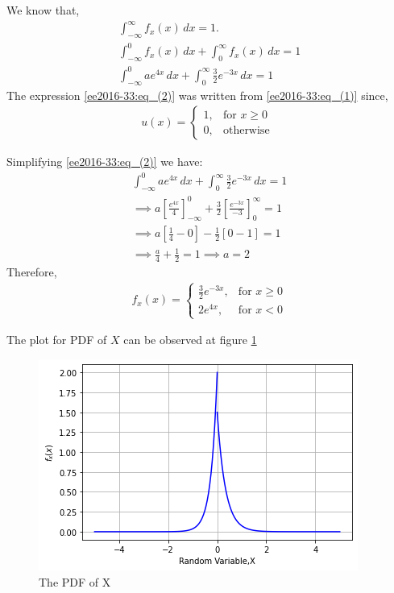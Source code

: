 We know that,
\begin{align}
\int_{-\infty}^{\infty}{f_x(x)}\,dx = 1.\\
\int_{-\infty}^{0}{f_x(x)}\,dx +\int_{0}^{\infty}{f_x(x)}\,dx = 1\label{ee2016-33:eq_(1)}\\
\int_{-\infty}^{0}{ae^{4x}}\,dx +\int_{0}^{\infty}{\frac{3}{2}e^{-3x}}\,dx = 1\label{ee2016-33:eq_(2)}
\end{align}
The expression \eqref{ee2016-33:eq_(2)} was written from \eqref{ee2016-33:eq_(1)} since,
\begin{align*}
  u(x) = 
  \begin{cases}
  1, & \text{for } x \geq 0\\
  0, & \text{otherwise } 
  \end{cases}
\end{align*}

Simplifying \eqref{ee2016-33:eq_(2)} we have:
\begin{align}
\int_{-\infty}^{0}{ae^{4x}}\,dx +\int_{0}^{\infty}{\frac{3}{2}e^{-3x}}\,dx = 1\nonumber\\
\implies a\left[\frac{e^{4x}}{4}\right]_{-\infty}^{0} +    \frac{3}{2}\left[\frac{e^{-3x}}{-3}\right]_0^{\infty} = 1\\
\implies a\left[\frac{1}{4}-0\right] - \frac{1}{2}\left[0-1\right] = 1\\
\implies \frac{a}{4} + \frac{1}{2} =1 \implies a = 2
\end{align}
Therefore,
\begin{align}
 f_x(x) = 
  \begin{cases}
  \frac{3}{2}e^{-3x}, & \text{for } x \geq 0\\
  2e^{4x}, & \text{for } x < 0
  \end{cases}
\end{align}

The plot for PDF of $X$ can be observed at figure \ref{ee2016-33:fig:The PDF of X}
\begin{figure}[!ht]
       \centering
    \includegraphics[width=.9\columnwidth] {solutions/ee/2016/33/Assignment_2_Fig_2.png}
    \caption{The PDF of X}
    \label{ee2016-33:fig:The PDF of X}
\end{figure}

